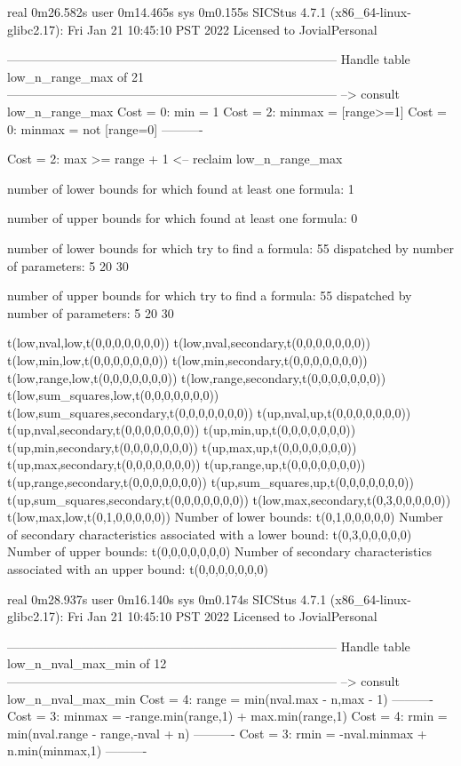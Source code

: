 real	0m26.582s
user	0m14.465s
sys	0m0.155s
SICStus 4.7.1 (x86_64-linux-glibc2.17): Fri Jan 21 10:45:10 PST 2022
Licensed to JovialPersonal


--------------------------------------------------------------------------------
Handle table low_n_range_max of 21
--------------------------------------------------------------------------------
--> consult low_n_range_max
Cost =  0:  min    = 1
Cost =  2:  minmax = [range>=1]
Cost =  0:  minmax = not [range=0]
----------

Cost =  2:  max >= range + 1
<-- reclaim low_n_range_max

number of lower bounds for which found at least one formula: 1

number of upper bounds for which found at least one formula: 0

number of lower bounds for which try to find a formula: 55
dispatched by number of parameters: 5  20  30

number of upper bounds for which try to find a formula: 55
dispatched by number of parameters: 5  20  30

t(low,nval,low,t(0,0,0,0,0,0,0))
t(low,nval,secondary,t(0,0,0,0,0,0,0))
t(low,min,low,t(0,0,0,0,0,0,0))
t(low,min,secondary,t(0,0,0,0,0,0,0))
t(low,range,low,t(0,0,0,0,0,0,0))
t(low,range,secondary,t(0,0,0,0,0,0,0))
t(low,sum_squares,low,t(0,0,0,0,0,0,0))
t(low,sum_squares,secondary,t(0,0,0,0,0,0,0))
t(up,nval,up,t(0,0,0,0,0,0,0))
t(up,nval,secondary,t(0,0,0,0,0,0,0))
t(up,min,up,t(0,0,0,0,0,0,0))
t(up,min,secondary,t(0,0,0,0,0,0,0))
t(up,max,up,t(0,0,0,0,0,0,0))
t(up,max,secondary,t(0,0,0,0,0,0,0))
t(up,range,up,t(0,0,0,0,0,0,0))
t(up,range,secondary,t(0,0,0,0,0,0,0))
t(up,sum_squares,up,t(0,0,0,0,0,0,0))
t(up,sum_squares,secondary,t(0,0,0,0,0,0,0))
t(low,max,secondary,t(0,3,0,0,0,0,0))
t(low,max,low,t(0,1,0,0,0,0,0))
Number of lower bounds:                                             t(0,1,0,0,0,0,0)
Number of secondary characteristics associated with a lower bound:  t(0,3,0,0,0,0,0)
Number of upper bounds:                                             t(0,0,0,0,0,0,0)
Number of secondary characteristics associated with an upper bound: t(0,0,0,0,0,0,0)

real	0m28.937s
user	0m16.140s
sys	0m0.174s
SICStus 4.7.1 (x86_64-linux-glibc2.17): Fri Jan 21 10:45:10 PST 2022
Licensed to JovialPersonal


--------------------------------------------------------------------------------
Handle table low_n_nval_max_min of 12
--------------------------------------------------------------------------------
--> consult low_n_nval_max_min
Cost =  4:  range  = min(nval.max - n,max - 1)
----------
Cost =  3:  minmax = -range.min(range,1) + max.min(range,1)
Cost =  4:  rmin   = min(nval.range - range,-nval + n)
----------
Cost =  3:  rmin   = -nval.minmax + n.min(minmax,1)
----------

